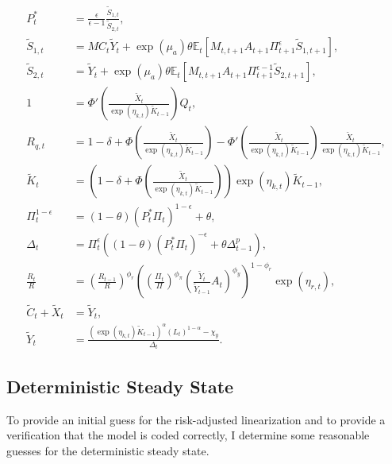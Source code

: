 \documentclass[12 pt, oneside]{article}
\theoremstyle{definition}
\theoremstyle{definition}
\theoremstyle{definition}
\newcommand{\E}{\mathbb{E}}
\begin{document}
\begin{align}
  P_t^* & = \frac{\epsilon}{\epsilon - 1}\frac{\tilde{S}_{1, t}}{\tilde{S}_{2, t}},\\
  \label{eq:numerator recursion eqm stat}
  \tilde{S}_{1, t} & = MC_t \tilde{Y}_t + \exp(\mu_a)\theta\E_t[M_{t, t + 1}A_{t + 1}\Pi_{t + 1}^\epsilon \tilde{S}_{1, t + 1}],\\
  \label{eq:denominator recursion eqm stat}
  \tilde{S}_{2, t} & = \tilde{Y}_t + \exp(\mu_a)\theta\E_t[M_{t, t + 1}A_{t + 1}\Pi_{t + 1}^{\epsilon - 1} \tilde{S}_{2, t + 1}],\\
  \label{eq:tobins q eqm stat}
  1 & = \Phi'\left(\frac{\tilde{X}_t}{\exp(\eta_{k, t})\tilde{K}_{t - 1}}\right) Q_t,\\
  \label{eq:Rq defn eqm stat}
  R_{q, t} & = 1 - \delta + \Phi\left(\frac{\tilde{X}_t}{\exp(\eta_{k, t})\tilde{K}_{t - 1}}\right) - \Phi'\left(\frac{\tilde{X}_t}{\exp(\eta_{k, t})\tilde{K}_{t - 1}}\right)\frac{\tilde{X}_t}{\exp(\eta_{k, t})\tilde{K}_{t - 1}},\\
  \label{eq:law of motion capital eqm stat}
  \tilde{K}_t & = \left(1 - \delta + \Phi\left(\frac{\tilde{X}_t}{\exp(\eta_{k, t})\tilde{K}_{t - 1}}\right)\right)\exp(\eta_{k, t})\tilde{K}_{t - 1},\\
  \label{eq:inflation from optimal reset price eqm stat}
  \Pi_t^{ 1 - \epsilon} & = (1 - \theta) (P_t^*\Pi_t)^{1 - \epsilon} + \theta,\\
  \label{eq:price dispersion evol eqm stat}
  \Delta_t & = \Pi_t^{\epsilon}((1 - \theta) (P_t^* \Pi_t)^{-\epsilon} + \theta \Delta_{t - 1}^p),\\
  \label{eq:taylor rule eqm stat}
  \frac{R_t}{R} & =  \left(\frac{R_{t - 1}}{R}\right)^{\phi_r}\left(\left(\frac{\Pi_t}{\Pi}\right)^{\phi_\pi}\left(\frac{\tilde{Y}_t}{\tilde{Y}_{t - 1}} A_t\right)^{\phi_y}\right)^{1 - \phi_r}\exp(\eta_{r, t}),\\
  \label{eq:output market clearing eqm stat}
  \tilde{C}_t + \tilde{X}_t & = \tilde{Y}_t,\\
  \label{eq:aggregate supply eqm stat}
  \tilde{Y}_t & = \frac{(\exp(\eta_{k, t}) \tilde{K}_{t - 1})^{\alpha}(L_t)^{1 - \alpha} - \chi_y}{\Delta_t}.
\end{align}

\subsection{Deterministic Steady State}
To provide an initial guess for the risk-adjusted linearization and to provide a verification that the model is coded correctly, I determine some reasonable guesses for the deterministic steady state.
\end{document}
